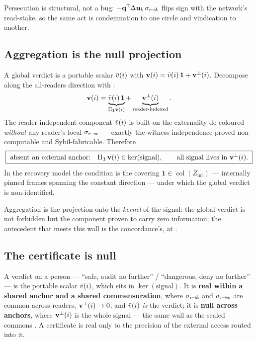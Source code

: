 \documentclass[../main]{subfiles}
\begin{document}
Persecution is structural, not a bug: $-\mathbf q\sp{\mathsf{T}}\Delta\mathbf{u}\sb{k}\,\sigma\sb{ r\!\to\!k }$
flips sign with the
network's read-stake, so the same act is condemnation to one circle and vindication to
another.


\subsection{Aggregation is the null projection}
\label{subsec:verd:null-projection}
%
\begin{theorem}
  A global verdict is a portable scalar $\bar{v}(i)$ with
  $\mathbf{v}(i)=\bar{v}(i)\,\mathbf 1+\mathbf{v}\sp{\perp}(i)$. Decompose along the all-readers direction with
  :
  \begin{equation}
    \mathbf{v}(i)=\underbrace{\bar{v}(i)\,\mathbf 1}_{\Pi\sb{\mathbf{1}}\mathbf{v}(i)}
      +\underbrace{\mathbf{v}\sp{\perp}(i)}_{\text{reader-indexed}}.
    \label{eq:verd:decompose}
  \end{equation}
  The reader-independent component $\bar{v}(i)$ is built on the externality de-coloured
  \emph{without} any reader's local $\sigma\sb{ r\!\to\!w }$ --- exactly the witness-independence
   proved non-computable and Sybil-fabricable. Therefore
  \begin{equation}
    \boxed{\ \text{absent an external anchor:}\quad
      \Pi\sb{\mathbf{1}}\,\mathbf{v}(i)\in\ker(\text{signal}),\qquad
      \text{all signal lives in }\mathbf{v}\sp{\perp}(i).\ }
    \label{eq:pr:agg}
  \end{equation}
  In the recovery model the condition is the covering
  $\mathbf 1\in\operatorname{col}(Z_{\mathrm{int}})$ --- internally pinned frames spanning
  the constant direction --- under which the global verdict is non-identified.
\end{theorem}

Aggregation is the projection onto the \emph{kernel} of the signal: the global verdict is not
forbidden but the component proven to carry zero information; the antecedent that meets
this wall is the concordance's, at .

\subsection{The certificate is null}
\label{subsec:verd:certificate}
%
\begin{corollary}
  A verdict on a person --- ``safe, audit no further'' / ``dangerous, deny no further'' ---
  is the portable scalar $\bar{v}(i)$, which sits in $\ker(\text{signal})$. It is \textbf{real
  within a shared anchor and a shared commensuration}, where $\sigma\sb{ r\!\to\!k }$ and $\sigma\sb{ r\!\to\!w }$
  are common across readers, $\mathbf{v}\sp{\perp}(i)\to0$, and $\bar{v}(i)$ \emph{is} the
  verdict; it is \textbf{null across anchors}, where $\mathbf{v}\sp{\perp}(i)$ is the whole signal ---
  the same wall as the sealed commons . A certificate is real only to the precision
  of the external access routed into it.
\end{corollary}
\end{document}
